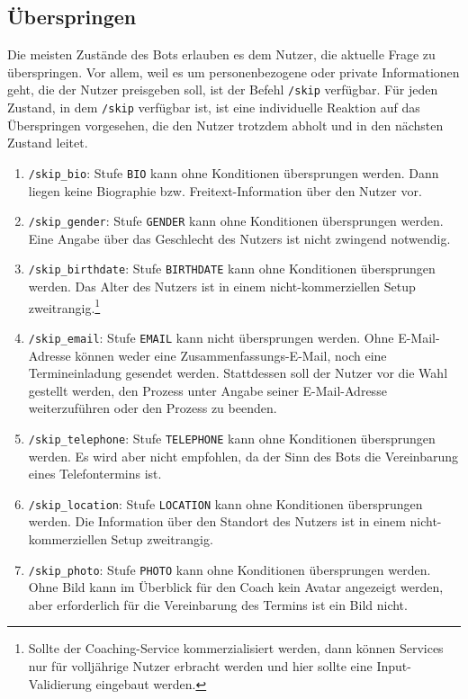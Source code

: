         \subsection{Überspringen} \label{Realisierung: skip}
            Die meisten Zustände des Bots erlauben es dem Nutzer, die aktuelle Frage zu überspringen. Vor allem, weil es um personenbezogene oder private Informationen geht, die der Nutzer preisgeben soll, ist der Befehl \verb|/skip| verfügbar. Für jeden Zustand, in dem \verb|/skip| verfügbar ist, ist eine individuelle Reaktion auf das Überspringen vorgesehen, die den Nutzer trotzdem abholt und in den nächsten Zustand leitet. 
            \begin{enumerate}
                \item \verb|/skip_bio|: Stufe \verb|BIO| kann ohne Konditionen übersprungen werden. Dann liegen keine Biographie bzw. Freitext-Information über den Nutzer vor.
                \item \verb|/skip_gender|: Stufe \verb|GENDER| kann ohne Konditionen übersprungen werden. Eine Angabe über das Geschlecht des Nutzers ist nicht zwingend notwendig.
                \item \verb|/skip_birthdate|: Stufe \verb|BIRTHDATE| kann ohne Konditionen übersprungen werden. Das Alter des Nutzers ist in einem nicht-kommerziellen Setup zweitrangig.\footnote{Sollte der Coaching-Service kommerzialisiert werden, dann können Services nur für volljährige Nutzer erbracht werden und hier sollte eine Input-Validierung eingebaut werden.}
                \item \verb|/skip_email|: Stufe \verb|EMAIL| kann nicht übersprungen werden. Ohne E-Mail-Adresse können weder eine Zusammenfassungs-E-Mail, noch eine Termineinladung gesendet werden. Stattdessen soll der Nutzer vor die Wahl gestellt werden, den Prozess unter Angabe seiner E-Mail-Adresse weiterzuführen oder den Prozess zu beenden.
                \item \verb|/skip_telephone|: Stufe \verb|TELEPHONE| kann ohne Konditionen übersprungen werden. Es wird aber nicht empfohlen, da der Sinn des Bots die Vereinbarung eines Telefontermins ist.
                \item \verb|/skip_location|: Stufe \verb|LOCATION| kann ohne Konditionen übersprungen werden. Die Information über den Standort des Nutzers ist in einem nicht-kommerziellen Setup zweitrangig. 
                \item \verb|/skip_photo|: Stufe \verb|PHOTO| kann ohne Konditionen übersprungen werden. Ohne Bild kann im Überblick für den Coach kein Avatar angezeigt werden, aber erforderlich für die Vereinbarung des Termins ist ein Bild nicht.
            \end{enumerate}
            
